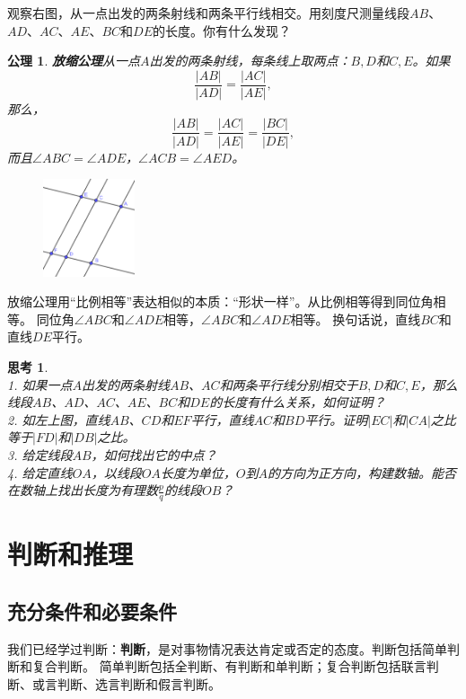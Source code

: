 \documentclass[12pt,UTF8]{ctexbook}
\newtheorem{sk}{思考}[section]
\newtheorem{po}{公理}
\begin{document}
观察右图，从一点出发的两条射线和两条平行线相交。用刻度尺测量线段$AB$、$AD$、$AC$、$AE$、$BC$和$DE$的长度。你有什么发现？
\begin{po}{\textbf{放缩公理}}\label{po:6}
    从一点$A$出发的两条射线，每条线上取两点：$B,D$和$C,E$。如果
    $$ \frac{|AB|}{|AD|} = \frac{|AC|}{|AE|},$$
    那么，
    $$ \frac{|AB|}{|AD|} = \frac{|AC|}{|AE|} = \frac{|BC|}{|DE|},$$
    而且$\angle ABC = \angle ADE$，$\angle ACB = \angle AED$。
\end{po}
\begin{figure} %
    \includegraphics[width=0.24\textwidth]{比例2.png}
\end{figure}

放缩公理用“比例相等”表达相似的本质：“形状一样”。从比例相等得到同位角相等。
同位角$\angle ABC$和$\angle ADE$相等，$\angle ABC$和$\angle ADE$相等。
换句话说，直线$BC$和直线$DE$平行。

\begin{sk}\label{sk:1-2-0}
    \mbox{}\\
    1. 如果一点$A$出发的两条射线$AB$、$AC$和两条平行线分别相交于$B,D$和$C,E$，那么线段$AB$、$AD$、$AC$、$AE$、$BC$和$DE$的长度有什么关系，如何证明？\\
    2. 如左上图，直线$AB$、$CD$和$EF$平行，直线$AC$和$BD$平行。证明$|EC|$和$|CA|$之比等于$|FD|$和$|DB|$之比。\\
    3. 给定线段$AB$，如何找出它的中点？\\
    4. 给定直线$OA$，以线段$OA$长度为单位，$O$到$A$的方向为正方向，构建数轴。能否在数轴上找出长度为有理数$\frac{p}{q}$的线段$OB$？
\end{sk}

\chapter{判断和推理}
\section{充分条件和必要条件}
我们已经学过判断：\textbf{判断}，是对事物情况表达肯定或否定的态度。判断包括简单判断和复合判断。
简单判断包括全判断、有判断和单判断；复合判断包括联言判断、或言判断、选言判断和假言判断。
\end{document}
